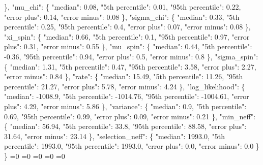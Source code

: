 {{      \}, %
      "mu\_chi": \{%
        "median": 0.08, %
        "5th percentile": 0.01, %
        "95th percentile": 0.22, %
        "error plus": 0.14, %
        "error minus": 0.08%
      \}, %
      "sigma\_chi": \{%
        "median": 0.33, %
        "5th percentile": 0.25, %
        "95th percentile": 0.4, %
        "error plus": 0.07, %
        "error minus": 0.08%
      \}, %
      "xi\_spin": \{%
        "median": 0.66, %
        "5th percentile": 0.1, %
        "95th percentile": 0.97, %
        "error plus": 0.31, %
        "error minus": 0.55%
      \}, %
      "mu\_spin": \{%
        "median": 0.44, %
        "5th percentile": {-}0.36, %
        "95th percentile": 0.94, %
        "error plus": 0.5, %
        "error minus": 0.8%
      \}, %
      "sigma\_spin": \{%
        "median": 1.31, %
        "5th percentile": 0.47, %
        "95th percentile": 3.58, %
        "error plus": 2.27, %
        "error minus": 0.84%
      \}, %
      "rate": \{%
        "median": 15.49, %
        "5th percentile": 11.26, %
        "95th percentile": 21.27, %
        "error plus": 5.78, %
        "error minus": 4.24%
      \}, %
      "log\_likelihood": \{%
        "median": {-}1008.9, %
        "5th percentile": {-}1014.76, %
        "95th percentile": {-}1004.61, %
        "error plus": 4.29, %
        "error minus": 5.86%
      \}, %
      "variance": \{%
        "median": 0.9, %
        "5th percentile": 0.69, %
        "95th percentile": 0.99, %
        "error plus": 0.09, %
        "error minus": 0.21%
      \}, %
      "min\_neff": \{%
        "median": 56.94, %
        "5th percentile": 33.8, %
        "95th percentile": 88.58, %
        "error plus": 31.64, %
        "error minus": 23.14%
      \}, %
      "selection\_neff": \{%
        "median": 1993.0, %
        "5th percentile": 1993.0, %
        "95th percentile": 1993.0, %
        "error plus": 0.0, %
        "error minus": 0.0%
      \}%
    \}}%
  \else%
    \ifnum{}=0%
      \let\MagTruncnormIidTiltIsotropicTruncnormNid@I@out\MagTruncnormIidTiltIsotropicTruncnormNid@III%
    \else%
      \ifnum{}=0%
      \let\MagTruncnormIidTiltIsotropicTruncnormNid@I@out\MagTruncnormIidTiltIsotropicTruncnormNid@IV%
    \else%
      \ifnum{}=0%
      \let\MagTruncnormIidTiltIsotropicTruncnormNid@I@out\MagTruncnormIidTiltIsotropicTruncnormNid@V%
    \else%
      \ifnum{}=0%
      \let\MagTruncnormIidTiltIsotropicTruncnormNid@I@out\MagTruncnormIidTiltIsotropicTruncnormNid@VI%
    \else%
      \ifnum{}=0%
      \let\MagTruncnormIidTiltIsotropicTruncnormNid@I@out\MagTruncnormIidTiltIsotropicTruncnormNid@VII%
}
